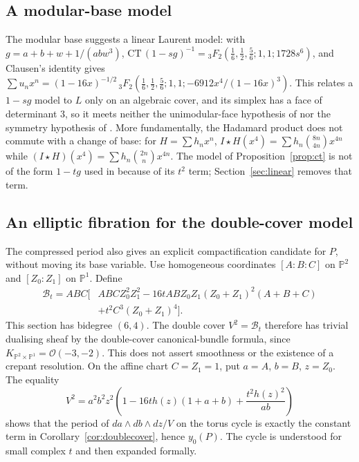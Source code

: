 \documentclass[11pt]{amsart}
\theoremstyle{definition}
\theoremstyle{remark}
\begin{document}
\subsection{A modular-base model}

The modular base suggests a linear Laurent model: with $g=a+b+w+1/(abw^3)$,
$\mathrm{CT}\,(1-sg)^{-1}={}_3F_2(\tfrac16,\tfrac12,\tfrac56;1,1;1728s^6)$, and Clausen's identity
gives $\sum u_nx^n=(1-16x)^{-1/2}\,{}_3F_2(\tfrac16,\tfrac12,\tfrac56;1,1;-6912x^4/(1-16x)^3)$.
This relates a $1-sg$ model to $L$ only on an algebraic cover, and its simplex has a face of
determinant $3$, so it meets neither the unimodular-face hypothesis of \cite[Thm.~3.3]{BV} nor the
symmetry hypothesis of \cite[Prop.~7.7]{BV3}. More fundamentally, the Hadamard product does not
commute with a change of base: for $H=\sum h_nx^n$, $I\star H(x^4)=\sum h_n\binom{8n}{4n}x^{4n}$
while $(I\star H)(x^4)=\sum h_n\binom{2n}{n}x^{4n}$. The model of Proposition~\ref{prop:ct} is not
of the form $1-tg$ used in \cite{BV,BV3} because of its $t^2$ term; Section~\ref{sec:linear}
removes that term.

\subsection{An elliptic fibration for the double-cover model}

The compressed period also gives an explicit compactification candidate for $P$,
without moving its base variable. Use homogeneous coordinates $[A:B:C]$ on
$\mathbb P^2$ and $[Z_0:Z_1]$ on $\mathbb P^1$. Define
\begin{align*}
\mathcal B_t=ABC\bigl[&ABC Z_0^2Z_1^2
-16t AB Z_0Z_1(Z_0+Z_1)^2(A+B+C)\\
&+t^2C^3(Z_0+Z_1)^4\bigr].
\end{align*}
This section has bidegree $(6,4)$. The double cover $V^2=\mathcal B_t$ therefore
has trivial dualising sheaf by the double-cover canonical-bundle formula,
since $K_{\mathbb P^2\times\mathbb P^1}=\mathcal O(-3,-2)$.
This does not assert smoothness or the existence of a crepant resolution.
On the affine chart $C=Z_1=1$, put $a=A$, $b=B$, $z=Z_0$. The equality
\[
V^2=a^2b^2z^2\left(1-16t h(z)(1+a+b)+\frac{t^2h(z)^2}{ab}\right)
\]
shows that the period of $da\wedge db\wedge dz/V$ on the torus cycle is exactly
the constant term in Corollary~\ref{cor:doublecover}, hence $y_0(P)$.
The cycle is understood for small complex $t$ and then expanded formally.
\end{document}
